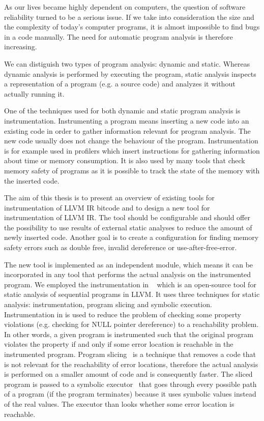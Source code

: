 As our lives became highly dependent on computers, the question of software
reliability turned to be a serious issue. If we take into consideration the
size and the complexity of today's computer programs, it is almost impossible
to find bugs in a code manually. The need for automatic program analysis is
therefore increasing.

We can distiguish two types of program analysis: dynamic and static. Whereas
dynamic analysis is performed by executing the program, static analysis
inspects a representation of a program (e.g. a source code) and analyzes it
without actually running it.

One of the techniques used for both dynamic and static program analysis is
instrumentation. Instrumenting a program means inserting a new code into an
existing code in order to gather information relevant for program analysis. The
new code usually does not change the behaviour of the program. Instrumentation
is for example used in profilers which insert instructions for gathering
information about time or memory consumption. It is also used by many tools
that check memory safety of programs as it is possible to track the state of
the memory with the inserted code.

The aim of this thesis is to present an overview of existing tools for
instrumentation of LLVM IR bitcode and to design a new tool for
instrumentation of LLVM IR. The tool should be configurable and should offer the
possibility to use results of external static analyses to reduce the amount of
newly inserted code. Another goal is to create a configuration for finding
memory safety errors such as double free, invalid dereference or
use-after-free-error.

The new tool is implemented as an independent module, which means it can be
incorporated in any tool that performs the actual analysis on the instrumented
program. We employed the instrumentation in \symbiotic~\cite{Symbiotic} which
is an open-source tool for static analysis of sequential programs in LLVM. It
uses three techniques for static analysis: instrumentation, program slicing and
symbolic execution. Instrumentation in \symbiotic is used to reduce the problem
of checking some property violations (e.g. checking for NULL pointer
dereference) to a reachability problem. In other words, a given program is
instrumented such that the original program violates the property if and only
if some error location is reachable in the instrumented program. Program
slicing~\cite{weiser} is a technique that removes a code that is not
relevant for the reachability of error locations, therefore the actual
analysis is performed on a smaller amount of code and is consequently
faster. The sliced program is passed to a symbolic executor~\cite{King} that goes
through every possible path of a program (if the program terminates)
because it uses symbolic values instead of the real values. The executor than
looks whether some error location is reachable.


